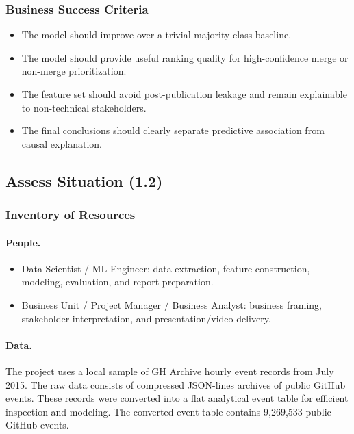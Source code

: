 \subsubsection*{Business Success Criteria}

\begin{itemize}
    \item The model should improve over a trivial majority-class baseline.
    \item The model should provide useful ranking quality for high-confidence merge or non-merge prioritization.
    \item The feature set should avoid post-publication leakage and remain explainable to non-technical stakeholders.
    \item The final conclusions should clearly separate predictive association from causal explanation.
\end{itemize}

\subsection{Assess Situation (1.2)}

\subsubsection*{Inventory of Resources}

\paragraph{People.}
\begin{itemize}
    \item Data Scientist / ML Engineer: data extraction, feature construction, modeling, evaluation, and
        report preparation.
    \item Business Unit / Project Manager / Business Analyst: business framing, stakeholder interpretation,
        and presentation/video delivery.
\end{itemize}

\paragraph{Data.}
The project uses a local sample of GH Archive hourly event records from July 2015. The raw data consists of
compressed JSON-lines archives of public GitHub events. These records were converted into a flat analytical
event table for efficient inspection and modeling. The converted event table contains 9,269,533 public GitHub events.

